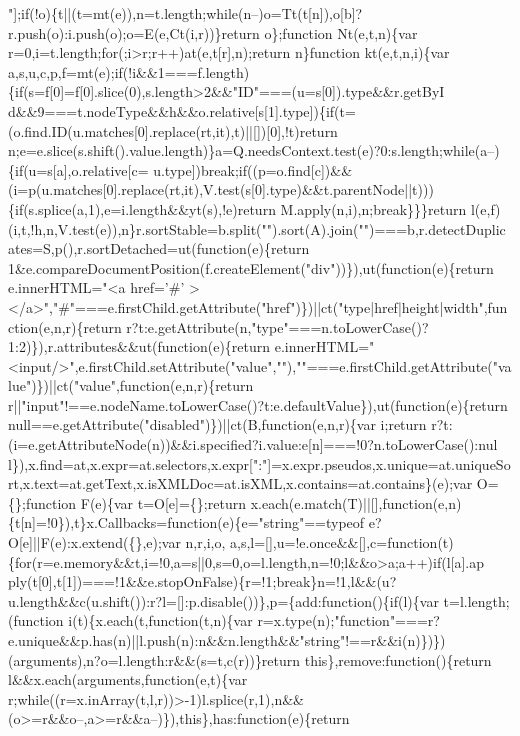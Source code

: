 \begin{DoxyCode}
{       "];if(!o)\{t||(t=mt(e)),n=t.length;while(n--)o=Tt(t[n]),o[b]?r.push(o):i.push(o);o=E(e,Ct(i,r))\}return o\};function Nt(e,t,n)\{var r=0,i=t.length;for(;i>r;r++)at(e,t[r],n);return n\}function
       kt(e,t,n,i)\{var
       a,s,u,c,p,f=mt(e);if(!i&&1===f.length)\{if(s=f[0]=f[0].slice(0),s.length>2&&"ID"===(u=s[0]).type&&r.getByI
      d&&9===t.nodeType&&h&&o.relative[s[1].type])\{if(t=(o.find.ID(u.matches[0].replace(rt,it),t)||[])[0],!t)return
       n;e=e.slice(s.shift().value.length)\}a=Q.needsContext.test(e)?0:s.length;while(a--)\{if(u=s[a],o.relative[c=
      u.type])break;if((p=o.find[c])&&(i=p(u.matches[0].replace(rt,it),V.test(s[0].type)&&t.parentNode||t)))\{if(s.splice(a,1),e=i.length&&yt(s),!e)return M.apply(n,i),n;break\}\}\}return
       l(e,f)(i,t,!h,n,V.test(e)),n\}r.sortStable=b.split("").sort(A).join("")===b,r.detectDuplicates=S,p(),r.sortDetached=ut(function(e)\{return
       1&e.compareDocumentPosition(f.createElement("div"))\}),ut(function(e)\{return e.innerHTML="<a href='}#\textcolor{stringliteral}{'
      ></a>","#"===e.firstChild.getAttribute("href")\})||ct("type|href|height|width",function(e,n,r)\{return
       r?t:e.getAttribute(n,"type"===n.toLowerCase()?1:2)\}),r.attributes&&ut(function(e)\{return
       e.innerHTML="<input/>",e.firstChild.setAttribute("value",""),""===e.firstChild.getAttribute("value")\})||ct("value",function(e,n,r)\{return
       r||"input"!==e.nodeName.toLowerCase()?t:e.defaultValue\}),ut(function(e)\{return
       null==e.getAttribute("disabled")\})||ct(B,function(e,n,r)\{var i;return
       r?t:(i=e.getAttributeNode(n))&&i.specified?i.value:e[n]===!0?n.toLowerCase():nul
      l\}),x.find=at,x.expr=at.selectors,x.expr[":"]=x.expr.pseudos,x.unique=at.uniqueSort,x.text=at.getText,x.isXMLDoc=at.isXML,x.contains=at.contains\}(e);var O=\{\};function F(e)\{var t=O[e]=\{\};return
       x.each(e.match(T)||[],function(e,n)\{t[n]=!0\}),t\}x.Callbacks=function(e)\{e="string"==typeof e?O[e]||F(e):x.extend(\{\},e);var
       n,r,i,o,
      a,s,l=[],u=!e.once&&[],c=function(t)\{for(r=e.memory&&t,i=!0,a=s||0,s=0,o=l.length,n=!0;l&&o>a;a++)if(l[a].ap
      ply(t[0],t[1])===!1&&e.stopOnFalse)\{r=!1;break\}n=!1,l&&(u?u.length&&c(u.shift()):r?l=[]:p.disable())\},p=\{add:function()\{if(l)\{var t=l.length;(function i(t)\{x.each(t,function(t,n)\{var
       r=x.type(n);"function"===r?e.unique&&p.has(n)||l.push(n):n&&n.length&&"string"!==r&&i(n)\})\})(arguments),n?o=l.length:r&&(s=t,c(r))\}return
       this\},remove:function()\{return l&&x.each(arguments,function(e,t)\{var
       r;while((r=x.inArray(t,l,r))>-1)l.splice(r,1),n&&(o>=r&&o--,a>=r&&a--)\}),this\},has:function(e)\{return
}
\end{DoxyCode}
